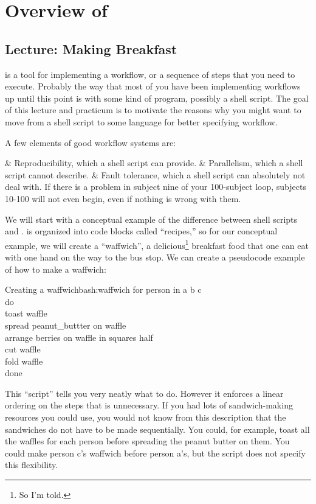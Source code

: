 \chapter{Overview of \maken{}}

\section{Lecture: Making Breakfast}

\maken{} is a tool for implementing a workflow, or a sequence of steps that you need to execute. Probably the way that most of you have been implementing workflows up until this point is with some kind of program, possibly a shell script. The goal of this lecture and practicum is to motivate the reasons why you might want to move from a shell script to some language for better specifying workflow.


A few elements of good workflow systems are:
\begin{easylist}[itemize]
	& Reproducibility, which a shell script can provide.
	& Parallelism, which a shell script cannot describe.
	& Fault tolerance, which a shell script can absolutely not deal with. If there is a problem in subject nine of your 100-subject loop, subjects 10-100 will not even begin, even if nothing is wrong with them.
\end{easylist}

We will start with a conceptual example of the difference between shell scripts and \maken{}. \maken{} is organized into code blocks called ``recipes,'' so for our conceptual example, we will create a ``waffwich'', a delicious\footnote{So I'm told.} breakfast food that one can eat with one hand on the way to the bus stop. We can create a pseudocode   example of how to make a waffwich:
\begin{bash}{Creating a waffwich}{bash:waffwich}
	for person in a b c \\
	do \\
	toast waffle \\
	spread peanut_buttter \dd on waffle \\
	arrange berries \dd on waffle \dd in squares \dd half \\
	cut waffle \\ 
	fold waffle \\
	done
\end{bash}

This ``script'' tells you very neatly what to do. However it enforces a linear ordering on the steps that is unnecessary. If you had lots of sandwich-making resources you could use, you would not know from this description that the sandwiches do not have to be made sequentially. You could, for example, toast all the waffles for each person before spreading the peanut butter on them. You could make person c's waffwich before person a's, but the script does not specify this flexibility.

